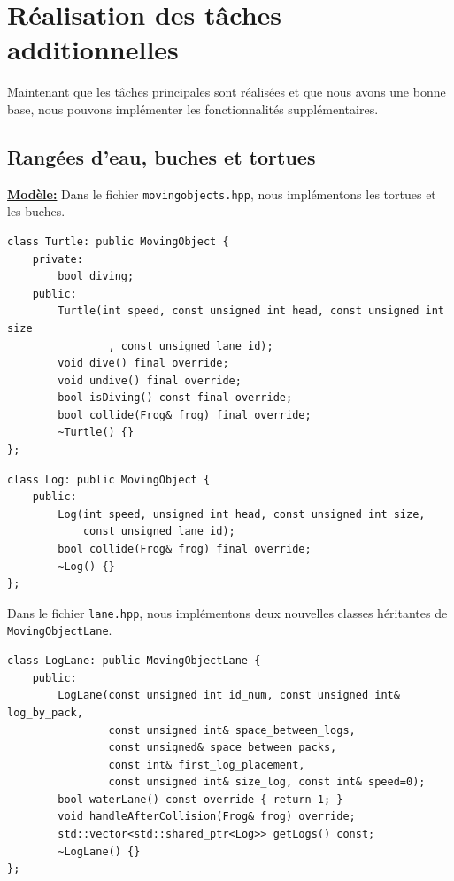 \documentclass[a4paper, 12pt]{article}
\begin{document}
\section{Réalisation des tâches additionnelles}

Maintenant que les tâches principales sont réalisées et que nous avons une bonne base, 
nous pouvons implémenter les fonctionnalités supplémentaires. 

\subsection{Rangées d'eau, buches et tortues} \label{turtle_class}

\underline{\textbf{Modèle:}} 
Dans le fichier \texttt{movingobjects.hpp}, nous implémentons les tortues et les buches. 

\begin{lstlisting}
class Turtle: public MovingObject {
    private:
        bool diving;
    public:
        Turtle(int speed, const unsigned int head, const unsigned int size
                , const unsigned lane_id);
        void dive() final override;
        void undive() final override;
        bool isDiving() const final override;
        bool collide(Frog& frog) final override;
        ~Turtle() {}
};
\end{lstlisting}

\begin{lstlisting}
class Log: public MovingObject {
    public:
        Log(int speed, unsigned int head, const unsigned int size,
            const unsigned lane_id);
        bool collide(Frog& frog) final override;
        ~Log() {}
};
\end{lstlisting} 

\pagebreak

Dans le fichier \texttt{lane.hpp}, nous implémentons deux nouvelles classes héritantes de \texttt{MovingObjectLane}.

\begin{lstlisting}
class LogLane: public MovingObjectLane {
    public:
        LogLane(const unsigned int id_num, const unsigned int& log_by_pack,
                const unsigned int& space_between_logs,
                const unsigned& space_between_packs,
                const int& first_log_placement,
                const unsigned int& size_log, const int& speed=0);
        bool waterLane() const override { return 1; }
        void handleAfterCollision(Frog& frog) override;
        std::vector<std::shared_ptr<Log>> getLogs() const;
        ~LogLane() {}
};
\end{lstlisting}
\end{document}
